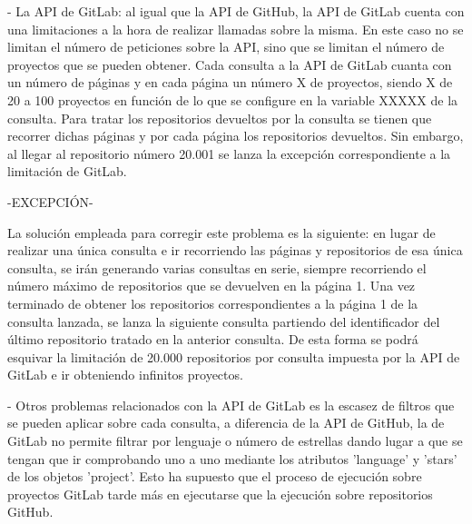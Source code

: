 - La API de GitLab: al igual que la API de GitHub, la API de GitLab cuenta con una limitaciones a la hora de realizar llamadas sobre la misma. En este caso no se limitan el número de peticiones sobre la API, sino que se limitan el número de proyectos que se pueden obtener.
Cada consulta a la API de GitLab cuanta con un número de páginas y en cada página un número X de proyectos, siendo X de 20 a 100 proyectos en función de lo que se configure en la variable XXXXX de la consulta. Para tratar los repositorios devueltos por la consulta se tienen que recorrer dichas páginas y por cada página los repositorios devueltos. Sin embargo, al llegar al repositorio número 20.001 se lanza la excepción correspondiente a la limitación de GitLab.

-EXCEPCIÓN-

La solución empleada para corregir este problema es la siguiente: en lugar de realizar una única consulta e ir recorriendo las páginas y repositorios de esa única consulta, se irán generando varias consultas en serie, siempre recorriendo el número máximo de repositorios que se devuelven en la página 1. Una vez terminado de obtener los repositorios correspondientes a la página 1 de la consulta lanzada, se lanza la siguiente consulta partiendo del identificador del último repositorio tratado en la anterior consulta. De esta forma se podrá esquivar la limitación de 20.000 repositorios por consulta impuesta por la API de GitLab e ir obteniendo infinitos proyectos.

- Otros problemas relacionados con la API de GitLab es la escasez de filtros que se pueden aplicar sobre cada consulta, a diferencia de la API de GitHub, la de GitLab no permite filtrar por lenguaje o número de estrellas dando lugar a que se tengan que ir comprobando uno a uno mediante los atributos 'language' y 'stars' de los objetos 'project'. Esto ha supuesto que el proceso de ejecución sobre proyectos GitLab tarde más en ejecutarse que la ejecución sobre repositorios GitHub.